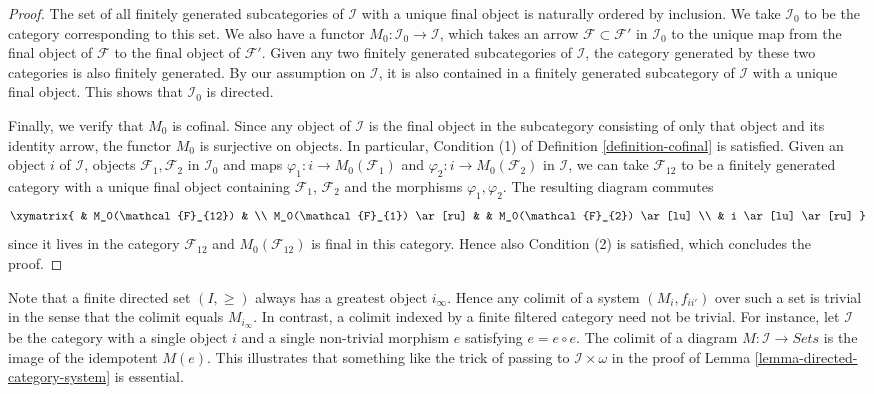 \begin{proof}
\medskip\noindent
The set of all finitely generated subcategories of $\mathcal{I}$
with a unique final object is naturally ordered by inclusion.
We take $\mathcal{I}_0$ to be the category corresponding
to this set. We also have a functor
$M_0 : \mathcal{I}_0 \to \mathcal{I}$, which takes an
arrow $\mathcal{F} \subset \mathcal{F'}$ in
$\mathcal{I}_0$ to the unique map from the final object of
$\mathcal{F}$ to the final object of $\mathcal{F}'$.
Given any two finitely generated subcategories of
$\mathcal{I}$, the category generated by these two categories is
also finitely generated. By our assumption on $\mathcal{I}$, it is
also contained in a finitely generated subcategory of $\mathcal{I}$
with a unique final object. This shows that $\mathcal{I}_0$ is directed.

\medskip\noindent
Finally, we verify that $M_0$ is cofinal. Since any
object of $\mathcal{I}$ is the final object in the subcategory
consisting of only that object and its identity arrow, the functor
$M_0$ is surjective on objects. In particular, Condition (1) of
Definition \ref{definition-cofinal} is satisfied. Given
an object $i$ of $\mathcal{I}$, objects $\mathcal{F}_1, \mathcal{F}_2$ in
$\mathcal{I}_0$ and maps $\varphi_1 : i \to M_0(\mathcal{F}_1)$
and $\varphi_2 : i \to M_0(\mathcal{F}_2)$ in
$\mathcal{I}$, we can take $\mathcal{F}_{12}$ to be a finitely
generated category with a unique final object containing
$\mathcal{F}_1$, $\mathcal{F}_2$ and the morphisms $\varphi_1, \varphi_2$.
The resulting diagram commutes
$$
\xymatrix{
& M_0(\mathcal{F}_{12}) & \\
M_0(\mathcal{F}_{1}) \ar[ru] & & M_0(\mathcal{F}_{2}) \ar[lu] \\
& i \ar[lu] \ar[ru]
}
$$
since it lives in the category $\mathcal{F}_{12}$ and
$M_0(\mathcal{F}_{12})$ is final in
this category. Hence also Condition (2) is satisfied, which concludes
the proof.
\end{proof}

\begin{remark}
\label{remark-trick-needed}
Note that a finite directed set $(I, \geq)$ always has a greatest object
$i_\infty$. Hence any colimit of a system $(M_i, f_{ii'})$ over such a set
is trivial in the sense that the colimit equals $M_{i_\infty}$. In contrast,
a colimit indexed by a finite filtered category need not
be trivial. For instance, let $\mathcal{I}$ be the category with a single object
$i$ and a single non-trivial morphism $e$ satisfying $e = e \circ e$. The
colimit of a diagram $M : \mathcal{I} \to Sets$ is the image of the
idempotent $M(e)$. This illustrates that something like the trick of passing
to $\mathcal{I}\times \omega$ in the proof of
Lemma \ref{lemma-directed-category-system} is essential.
\end{remark}

